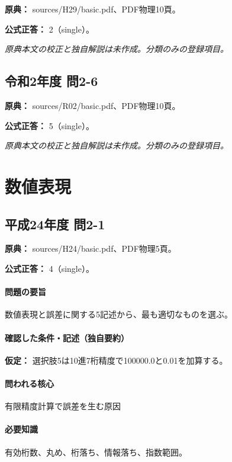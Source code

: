 \noindent\textbf{原典：} sources/H29/basic.pdf、PDF物理10頁。

\textbf{公式正答：} 2（single）。

\par\textit{原典本文の校正と独自解説は未作成。分類のみの登録項目。}

\subsection{令和2年度 問2-6}
\label{q:r02-reg-basic-2-6}

\noindent\textbf{原典：} sources/R02/basic.pdf、PDF物理10頁。

\textbf{公式正答：} 5（single）。

\par\textit{原典本文の校正と独自解説は未作成。分類のみの登録項目。}

\section{数値表現}

\subsection{平成24年度 問2-1}
\label{q:h24-reg-basic-2-1}

\noindent\textbf{原典：} sources/H24/basic.pdf、PDF物理5頁。

\textbf{公式正答：} 4（single）。

\paragraph{問題の要旨} 数値表現と誤差に関する5記述から、最も適切なものを選ぶ。

\paragraph{確認した条件・記述（独自要約）}\mbox{}\par

\noindent\textbf{仮定：} 選択肢5は10進7桁精度で100000.0と0.01を加算する。\par

\paragraph{問われる核心} 有限精度計算で誤差を生む原因

\paragraph{必要知識} 有効桁数、丸め、桁落ち、情報落ち、指数範囲。


